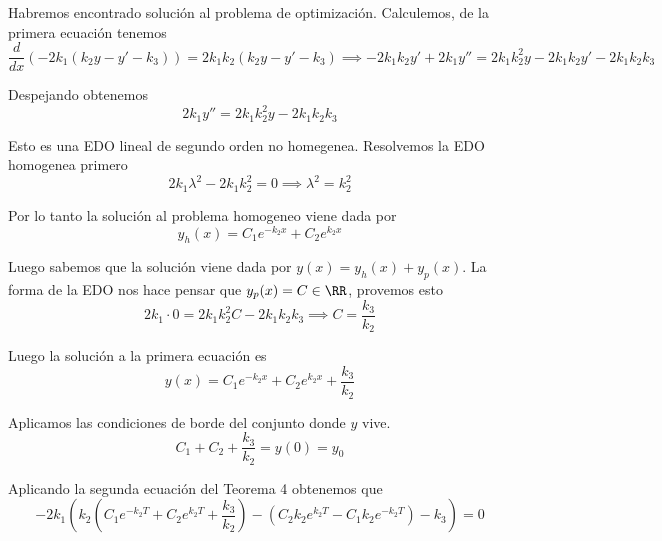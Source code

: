 \documentclass[a4paper,oneside,10.5pt]{USMArt}
\begin{document}
\begin{sol}
\begin{enumerate}
        Habremos encontrado solución al problema de optimización. Calculemos, de la primera ecuaci\'on tenemos
        \begin{equation*}
          \frac{d}{dx}(-2k_{1}(k_{2}y - y' - k_{3})) = 2k_{1}k_{2}(k_{2}y - y' -k_{3}) \implies -2k_{1}k_{2}y' + 2k_{1}y'' = 2k_{1}k_{2}^{2}y - 2k_{1}k_{2}y' - 2k_{1}k_{2}k_{3}
        \end{equation*}

        Despejando obtenemos
        \begin{equation*}
          2k_{1}y'' = 2k_{1}k_{2}^{2}y - 2k_{1}k_{2}k_{3}
        \end{equation*}

        Esto es una EDO lineal de segundo orden no homegenea. Resolvemos la EDO homogenea primero
        \begin{equation*}
          2k_{1} \lambda^{2} - 2k_{1}k_{2}^{2} = 0 \implies \lambda^{2} = k_{2}^{2}
        \end{equation*}

        Por lo tanto la soluci\'on al problema homogeneo viene dada por
        \begin{equation*}
          y_{h}(x) = C_{1}e^{-k_{2}x} + C_{2}e^{k_{2}x}
        \end{equation*}

        Luego sabemos que la solución viene dada por $y(x) = y_{h}(x) + y_{p}(x)$. La forma de la EDO nos hace
        pensar que $y_{p}(x) = C \in \RR$, provemos esto
        \begin{equation*}
          2k_{1}\cdot 0 = 2k_{1}k_{2}^{2}C - 2k_{1}k_{2}k_{3} \implies C = \frac{k_{3}}{k_{2}}
        \end{equation*}

        Luego la solución a la primera ecuación es
        \begin{equation*}
          y(x) = C_{1}e^{-k_{2}x} + C_{2}e^{k_{2}x} + \frac{k_{3}}{k_{2}}
        \end{equation*}

        Aplicamos las condiciones de borde del conjunto donde $y$ vive.
        \begin{equation*}
          C_{1} + C_{2} + \frac{k_{3}}{k_{2}}= y(0) = y_{0}
        \end{equation*}

        Aplicando la segunda ecuación del Teorema 4 obtenemos que
        \begin{equation*}
          -2k_{1}(k_{2}(C_{1}e^{-k_{2}T} + C_{2}e^{k_{2}T} + \frac{k_{3}}{k_{2}}) - (C_{2}k_{2}e^{k_{2}T} - C_{1}k_{2}e^{-k_{2}T}) - k_{3}) = 0
        \end{equation*}


\end{enumerate}
\end{sol}
\end{document}
